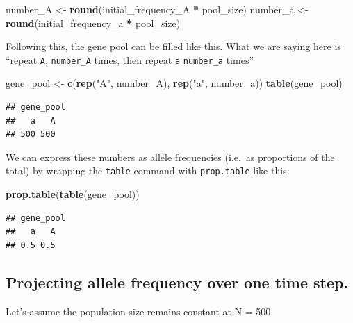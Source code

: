 \documentclass[
  a4paper]{book}
\newenvironment{Shaded}{\begin{snugshade}}{\end{snugshade}}
\newcommand{\FunctionTok}[1]{\textcolor[rgb]{0.13,0.29,0.53}{\textbf{#1}}}
\newcommand{\NormalTok}[1]{#1}
\newcommand{\OtherTok}[1]{\textcolor[rgb]{0.56,0.35,0.01}{#1}}
\newcommand{\SpecialCharTok}[1]{\textcolor[rgb]{0.81,0.36,0.00}{\textbf{#1}}}
\newcommand{\StringTok}[1]{\textcolor[rgb]{0.31,0.60,0.02}{#1}}
\begin{document}
\begin{Shaded}
\begin{Highlighting}[]
\NormalTok{number\_A }\OtherTok{\textless{}{-}} \FunctionTok{round}\NormalTok{(initial\_frequency\_A }\SpecialCharTok{*}\NormalTok{ pool\_size)}
\NormalTok{number\_a }\OtherTok{\textless{}{-}} \FunctionTok{round}\NormalTok{(initial\_frequency\_a }\SpecialCharTok{*}\NormalTok{ pool\_size)}
\end{Highlighting}
\end{Shaded}

Following this, the gene pool can be filled like this.
What we are saying here is ``repeat \texttt{A}, \texttt{number\_A} times, then repeat \texttt{a} \texttt{number\_a} times''

\begin{Shaded}
\begin{Highlighting}[]
\NormalTok{gene\_pool }\OtherTok{\textless{}{-}} \FunctionTok{c}\NormalTok{(}\FunctionTok{rep}\NormalTok{(}\StringTok{"A"}\NormalTok{, number\_A), }\FunctionTok{rep}\NormalTok{(}\StringTok{"a"}\NormalTok{, number\_a))}
\FunctionTok{table}\NormalTok{(gene\_pool)}
\end{Highlighting}
\end{Shaded}

\begin{verbatim}
## gene_pool
##   a   A 
## 500 500
\end{verbatim}

We can express these numbers as allele frequencies (i.e.~as proportions of the total) by wrapping the \texttt{table} command with \texttt{prop.table} like this:

\begin{Shaded}
\begin{Highlighting}[]
\FunctionTok{prop.table}\NormalTok{(}\FunctionTok{table}\NormalTok{(gene\_pool))}
\end{Highlighting}
\end{Shaded}

\begin{verbatim}
## gene_pool
##   a   A 
## 0.5 0.5
\end{verbatim}

\subsection{Projecting allele frequency over one time step.}\label{projecting-allele-frequency-over-one-time-step.}

Let's assume the population size remains constant at N = 500.
\end{document}
